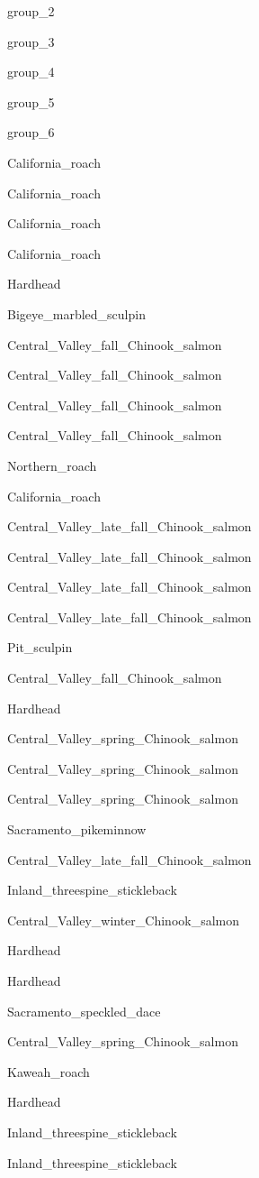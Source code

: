 \documentclass[]{article}
\begin{document}
group\_2

group\_3

group\_4

group\_5

group\_6

California\_roach

California\_roach

California\_roach

California\_roach

Hardhead

Bigeye\_marbled\_sculpin

Central\_Valley\_fall\_Chinook\_salmon

Central\_Valley\_fall\_Chinook\_salmon

Central\_Valley\_fall\_Chinook\_salmon

Central\_Valley\_fall\_Chinook\_salmon

Northern\_roach

California\_roach

Central\_Valley\_late\_fall\_Chinook\_salmon

Central\_Valley\_late\_fall\_Chinook\_salmon

Central\_Valley\_late\_fall\_Chinook\_salmon

Central\_Valley\_late\_fall\_Chinook\_salmon

Pit\_sculpin

Central\_Valley\_fall\_Chinook\_salmon

Hardhead

Central\_Valley\_spring\_Chinook\_salmon

Central\_Valley\_spring\_Chinook\_salmon

Central\_Valley\_spring\_Chinook\_salmon

Sacramento\_pikeminnow

Central\_Valley\_late\_fall\_Chinook\_salmon

Inland\_threespine\_stickleback

Central\_Valley\_winter\_Chinook\_salmon

Hardhead

Hardhead

Sacramento\_speckled\_dace

Central\_Valley\_spring\_Chinook\_salmon

Kaweah\_roach

Hardhead

Inland\_threespine\_stickleback

Inland\_threespine\_stickleback
\end{document}
